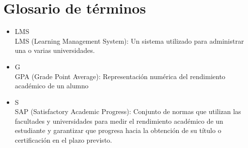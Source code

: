 \section*{Glosario de términos}

\begin{itemize}
    \item LMS \\
    LMS (Learning Management System): Un sistema utilizado para administrar una o varias universidades.

    \item G \\
    GPA (Grade Point Average): Representación numérica del rendimiento académico de un alumno

    \item S \\
    SAP (Satisfactory Academic Progress): Conjunto de normas que utilizan las facultades y universidades para medir el rendimiento académico de un estudiante y garantizar que progresa hacia la obtención de su título o certificación en el plazo previsto.
\end{itemize}
